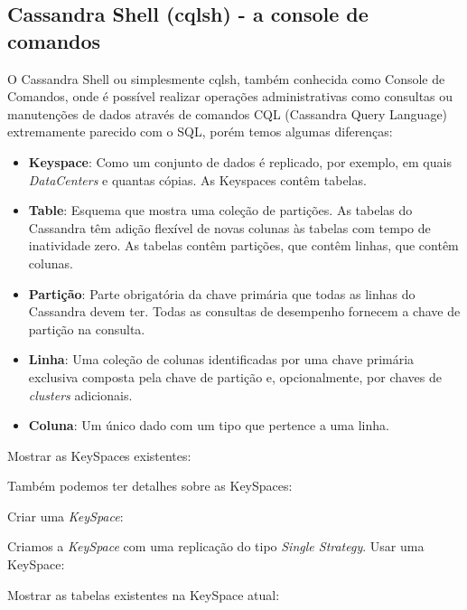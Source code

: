 \subsection{Cassandra Shell (cqlsh) - a console de comandos}
O Cassandra Shell ou simplesmente cqlsh, também conhecida como Console de Comandos, onde é possível realizar operações administrativas como consultas ou manutenções de dados através de comandos CQL (Cassandra Query Language) extremamente parecido com o SQL, porém temos algumas diferenças:
\begin{itemize}[nolistsep]
	\item \textbf{Keyspace}: Como um conjunto de dados é replicado, por exemplo, em quais \textit{DataCenters} e quantas cópias. As Keyspaces contêm tabelas.
	\item \textbf{Table}: Esquema que mostra uma coleção de partições. As tabelas do Cassandra têm adição flexível de novas colunas às tabelas com tempo de inatividade zero. As tabelas contêm partições, que contêm linhas, que contêm colunas.
	\item \textbf{Partição}: Parte obrigatória da chave primária que todas as linhas do Cassandra devem ter. Todas as consultas de desempenho fornecem a chave de partição na consulta.
	\item \textbf{Linha}: Uma coleção de colunas identificadas por uma chave primária exclusiva composta pela chave de partição e, opcionalmente, por chaves de \textit{clusters} adicionais.
	\item \textbf{Coluna}: Um único dado com um tipo que pertence a uma linha. 
\end{itemize}
	
Mostrar as KeySpaces existentes: \\

Também podemos ter detalhes sobre as KeySpaces:
\\


Criar uma \textit{KeySpace}: \\


Criamos a \textit{KeySpace} com uma replicação do tipo \textit{Single Strategy}. Usar uma KeySpace: \\


Mostrar as tabelas existentes na KeySpace atual: \\

